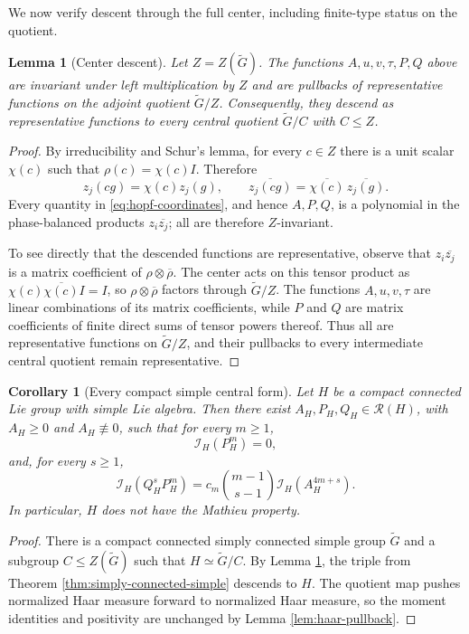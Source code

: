 \documentclass[11pt]{article}
\numberwithin{equation}{section}
\newtheorem{lemma}[theorem]{Lemma}
\newtheorem{corollary}[theorem]{Corollary}
\newcommand{\cR}{\mathcal R}
\newcommand{\cI}{\mathcal I}
\begin{document}
We now verify descent through the full center, including finite-type status on
the quotient.

\begin{lemma}[Center descent]\label{lem:center-descent}
Let $Z=Z(\widetilde G)$.  The functions $A,u,v,\tau,P,Q$ above are invariant
under left multiplication by $Z$ and are pullbacks of representative
functions on the adjoint quotient $\widetilde G/Z$.  Consequently, they
descend as representative functions to every central quotient
$\widetilde G/C$ with $C\leq Z$.
\end{lemma}

\begin{proof}
By irreducibility and Schur's lemma, for every $c\in Z$ there is a unit scalar
$\chi(c)$ such that $\rho(c)=\chi(c)I$.  Therefore
\[
 z_j(cg)=\chi(c)z_j(g),
 \qquad
 \overline{z_j(cg)}=\overline{\chi(c)}\,\overline{z_j(g)}.
\]
Every quantity in \eqref{eq:hopf-coordinates}, and hence $A,P,Q$, is a
polynomial in the phase-balanced products $z_i\overline{z_j}$; all are
therefore $Z$-invariant.

To see directly that the descended functions are representative, observe
that $z_i\overline{z_j}$ is a matrix coefficient of
$\rho\otimes\overline\rho$.  The center acts on this tensor product as
$\chi(c)\overline{\chi(c)}I=I$, so $\rho\otimes\overline\rho$ factors through
$\widetilde G/Z$.  The functions $A,u,v,\tau$ are linear combinations of its
matrix coefficients, while $P$ and $Q$ are matrix coefficients of finite
direct sums of tensor powers thereof.  Thus all are representative functions
on $\widetilde G/Z$, and their pullbacks to every intermediate central
quotient remain representative.
\end{proof}

\begin{corollary}[Every compact simple central form]
\label{cor:simple-central-forms}
Let $H$ be a compact connected Lie group with simple Lie algebra.  Then there
exist $A_H,P_H,Q_H\in\cR(H)$, with $A_H\geq0$ and $A_H\not\equiv0$, such that
for every $m\geq1$,
\[
 \cI_H(P_H^m)=0,
\]
and, for every $s\geq1$,
\[
 \cI_H(Q_H^sP_H^m)
 =c_m\binom{m-1}{s-1}\cI_H(A_H^{4m+s}).
\]
In particular, $H$ does not have the Mathieu property.
\end{corollary}

\begin{proof}
There is a compact connected simply connected simple group $\widetilde G$ and
a subgroup $C\leq Z(\widetilde G)$ such that
$H\simeq\widetilde G/C$.  By Lemma \ref{lem:center-descent}, the triple from
Theorem \ref{thm:simply-connected-simple} descends to $H$.  The quotient map
pushes normalized Haar measure forward to normalized Haar measure, so the
moment identities and positivity are unchanged by Lemma
\ref{lem:haar-pullback}.
\end{proof}
\end{document}

